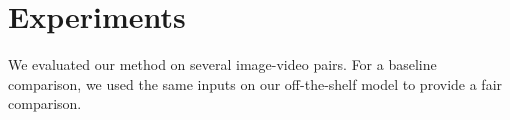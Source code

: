 \section{Experiments}

We evaluated our method on several image-video pairs. For a baseline comparison, we used the same inputs on our off-the-shelf model to provide a fair comparison.